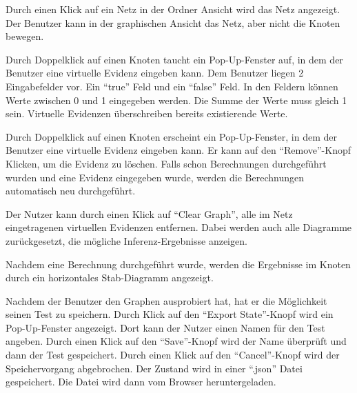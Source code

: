 \documentclass[parskip=full,11pt,twoside]{scrartcl}
\begin{document}

Durch einen Klick auf ein Netz in der Ordner Ansicht wird das Netz angezeigt. 
Der Benutzer kann in der graphischen Ansicht das Netz, aber nicht die Knoten bewegen.


Durch Doppelklick auf einen Knoten taucht ein Pop-Up-Fenster auf, in dem der Benutzer eine virtuelle Evidenz eingeben kann.
Dem Benutzer liegen 2 Eingabefelder vor. Ein  \enquote{true} Feld und ein \enquote{false} Feld. In den Feldern können Werte zwischen 0 und 1
eingegeben werden.
Die Summe der Werte muss gleich 1 sein.
Virtuelle Evidenzen überschreiben bereits existierende Werte.


Durch Doppelklick auf einen Knoten erscheint ein Pop-Up-Fenster, in dem der Benutzer eine virtuelle Evidenz eingeben kann.
Er kann auf den \enquote{Remove}-Knopf Klicken, um die Evidenz zu löschen.
Falls schon Berechnungen durchgeführt wurden und eine Evidenz eingegeben wurde, werden die Berechnungen automatisch neu durchgeführt.


Der Nutzer kann durch einen Klick auf \enquote{Clear Graph}, alle im Netz eingetragenen virtuellen Evidenzen entfernen. Dabei werden auch alle Diagramme zurückgesetzt, die mögliche Inferenz-Ergebnisse anzeigen.


Nachdem eine Berechnung durchgeführt wurde, werden die Ergebnisse im Knoten durch ein horizontales Stab-Diagramm angezeigt.


Nachdem der Benutzer den Graphen ausprobiert hat, hat er die Möglichkeit seinen Test zu speichern.
Durch Klick auf den \enquote{Export State}-Knopf wird ein Pop-Up-Fenster angezeigt. Dort kann der Nutzer einen Namen für den Test angeben.
Durch einen Klick auf den \enquote{Save}-Knopf wird der Name überprüft und dann der Test gespeichert.
Durch einen Klick auf den \enquote{Cancel}-Knopf wird der Speichervorgang abgebrochen.
Der Zustand wird in einer \enquote{.json} Datei gespeichert. Die Datei wird dann vom Browser heruntergeladen.
\end{document}
